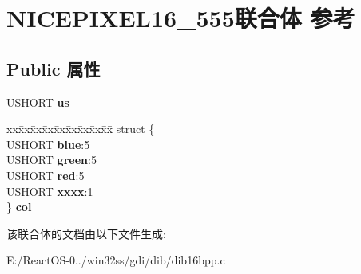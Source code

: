 \hypertarget{union_n_i_c_e_p_i_x_e_l16__555}{}\section{N\+I\+C\+E\+P\+I\+X\+E\+L16\+\_\+555联合体 参考}
\label{union_n_i_c_e_p_i_x_e_l16__555}
\subsection*{Public 属性}
\begin{DoxyCompactItemize}
\item 
\mbox{\label{union_n_i_c_e_p_i_x_e_l16__555_a2e88e566e440faa8f03f8a55817d5486}} 
U\+S\+H\+O\+RT {\bfseries us}
\item 
\mbox{\label{union_n_i_c_e_p_i_x_e_l16__555_a4f3714ee538778641af12ffc6bf5c6df}} 
\begin{tabbing}
xx\=xx\=xx\=xx\=xx\=xx\=xx\=xx\=xx\=\kill
struct \{\\
\>USHORT {\bfseries blue}:5\\
\>USHORT {\bfseries green}:5\\
\>USHORT {\bfseries red}:5\\
\>USHORT {\bfseries xxxx}:1\\
\} {\bfseries col}\\

\end{tabbing}\end{DoxyCompactItemize}


该联合体的文档由以下文件生成\+:\begin{DoxyCompactItemize}
\item 
E\+:/\+React\+O\+S-\/0../win32ss/gdi/dib/dib16bpp.\+c\end{DoxyCompactItemize}
